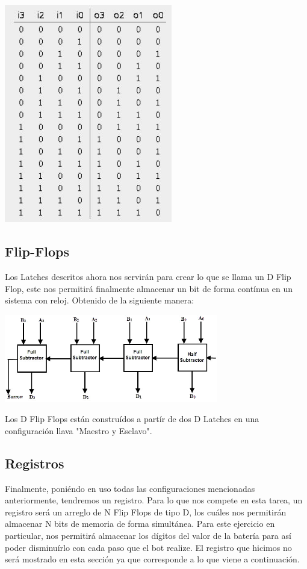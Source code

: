 \documentclass[a4paper]{article}
\begin{document}
\begin{center}
	\includegraphics[width=0.55\textwidth]{tarea-2-ej-2.jpg}
\end{center}

\subsection*{Flip-Flops}

Los Latches descritos ahora nos servirán para crear lo que se llama un D Flip Flop, este nos permitirá finalmente almacenar un bit de forma contínua
en un sistema con reloj. Obtenido de la siguiente manera:

\begin{center}
	\includegraphics[width=0.7\textwidth]{tarea-2-ej-3.jpg}
\end{center}

Los D Flip Flops están construídos a partír de dos D Latches en una configuración llava "Maestro y Esclavo".

\subsection*{Registros}

Finalmente, poniéndo en uso todas las configuraciones mencionadas anteriormente, tendremos un registro. Para lo que nos compete en esta tarea, un
registro será un arreglo de N Flip Flops de tipo D, los cuáles nos permitirán almacenar N bits de memoria de forma simultánea. Para este ejercicio
en particular, nos permitirá almacenar los dígitos del valor de la batería para así poder disminuírlo con cada paso que el bot realize. El registro
que hicimos no será mostrado en esta sección ya que corresponde a lo que viene a continuación.
\end{document}
